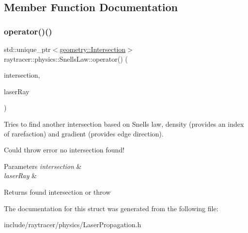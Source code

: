 \subsection{Member Function Documentation}
\mbox{\label{structraytracer_1_1physics_1_1SnellsLaw_a7e46909c41385ab586a800dd6f8c0b28}} 
\subsubsection{\texorpdfstring{operator()()}{operator()()}}
{\footnotesize\ttfamily std\+::unique\+\_\+ptr$<$\hyperlink{structraytracer_1_1geometry_1_1Intersection}{geometry\+::\+Intersection}$>$ raytracer\+::physics\+::\+Snells\+Law\+::operator() (\begin{DoxyParamCaption}\item[{const \hyperlink{structraytracer_1_1geometry_1_1Intersection}{geometry\+::\+Intersection} \&}]{intersection,  }\item[{const \hyperlink{structraytracer_1_1physics_1_1LaserRay}{Laser\+Ray} \&}]{laser\+Ray }\end{DoxyParamCaption})}



Tries to find another intersection based on Snells law, density (provides an index of rarefaction) and gradient (provides edge direction). 

Could throw error no intersection found! 
\begin{DoxyParams}{Parameters}
{\em intersection} & \\
\hline
{\em laser\+Ray} & \\
\hline
\end{DoxyParams}
\begin{DoxyReturn}{Returns}
found intersection or throw 
\end{DoxyReturn}


The documentation for this struct was generated from the following file\+:\begin{DoxyCompactItemize}
\item 
include/raytracer/physics/Laser\+Propagation.\+h\end{DoxyCompactItemize}
